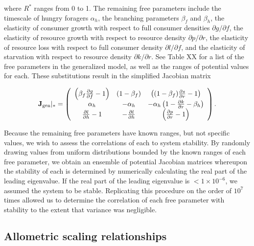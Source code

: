 \documentclass[12pt,english]{article}
\begin{document}
\begin{spacing}{1.9}
\noindent where $R^*$ ranges from 0 to 1.
The remaining free parameters include the timescale of hungry foragers $\alpha_h$, the branching parameters $\beta_f$ and $\beta_h$, the elasticity of consumer growth with respect to full consumer densities $\partial g / \partial f$, the elasticity of resource growth with respect to resource density $\partial p / \partial r$, the elasticity of resource loss with respect to full consumer density $\partial l / \partial f$, and the elasticity of starvation with respect to resource density $\partial k / \partial r$.
See Table XX for a list of the free parameters in the generalized model, as well as the ranges of potential values for each.
These substitutions result in the simplified Jacobian matrix

\begin{equation}
\mathbf{J}_{\rm gen}|_* =
\left(
\begin{array}{ccc}
 \left(\beta_f \frac{\partial g}{\partial f} - 1 \right) & (1-\beta_f) & \left( (1-\beta_f)\frac{\partial s}{\partial r} - 1 \right) \\
 \alpha_h & -\alpha_h & -\alpha_h \left(1-\frac{\partial k}{\partial r} - \beta_h  \right) \\
 \frac{\partial l}{\partial h}-1 & -\frac{\partial l}{\partial h} &  \left( \frac{\partial p}{\partial r} - 1 \right) \\
\end{array}
\right).
\label{eq_Jacgen}
\end{equation}

Because the remaining free parameters have known ranges, but not specific values, we wish to assess the correlations of each to system stability.
By randomly drawing values from uniform distributions bounded by the known ranges of each free parameter, we obtain an ensemble of potential Jacobian matrices whereupon the stability of each is determined by numerically calculating the real part of the leading eigenvalue.
If the real part of the leading eigenvalue is $<1\times10^{-6}$, we assumed the system to be stable.
Replicating this procedure on the order of $10^7$ times allowed us to determine the correlation of each free parameter with stability to the extent that variance was negligible.



\subsection{Allometric scaling relationships}


\end{spacing}
\end{document}
